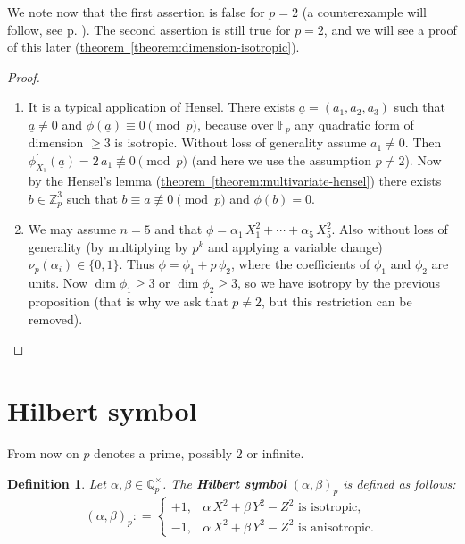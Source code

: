 \documentclass{article}
\newcommand{\term}{\textbf}
\newcommand{\dfn}{\mathrel{\mathop:}=}
\newcommand{\ZZ}{\mathbb{Z}}
\newcommand{\FF}{\mathbb{F}}
\newcommand{\QQ}{\mathbb{Q}}
\newcommand{\refref}[2]{\hyperref[#2]{#1~\ref*{#2}}}
\theoremstyle{myplain}
\theoremstyle{mydefinition}
\newtheorem{definition}[proposition]{Definition}
\begin{document}
We note now that the first assertion is false for $p = 2$ (a counterexample will
follow, see p. \pageref{x2y2z2-anisotropic-over-q2}). The second assertion is
still true for $p = 2$, and we will see a proof of this later
(\refref{theorem}{theorem:dimension-isotropic}).

\begin{proof}
  \begin{enumerate}
  \item It is a typical application of Hensel. There exists
    $\underline{a} = (a_1,a_2,a_3)$ such that $\underline{a} \ne 0$ and
    $\phi (\underline{a}) \equiv 0 \pmod{p}$, because over $\FF_p$ any quadratic
    form of dimension $\ge 3$ is isotropic. Without loss of generality assume
    $a_1 \ne 0$. Then
    $\phi^\prime_{X_1} (\underline{a}) = 2\,a_1 \not\equiv 0 \pmod{p}$ (and here
    we use the assumption $p \ne 2$). Now by the Hensel's lemma
    (\refref{theorem}{theorem:multivariate-hensel}) there exists
    $\underline{b} \in \ZZ_p^3$ such that
    $\underline{b} \equiv \underline{a} \not \equiv 0 \pmod{p}$ and
    $\phi (\underline{b}) = 0$.

  \item We may assume $n = 5$ and that
    $\phi = \alpha_1\,X_1^2 + \cdots + \alpha_5\,X_5^2$. Also without loss of
    generality (by multiplying by $p^k$ and applying a variable change)
    $ \nu_p (\alpha_i) \in \{ 0,1 \}$. Thus $\phi = \phi_1 + p\,\phi_2$, where
    the coefficients of $\phi_1$ and $\phi_2$ are units. Now $\dim \phi_1 \ge 3$
    or $\dim \phi_2 \ge 3$, so we have isotropy by the previous proposition
    (that is why we ask that $p \ne 2$, but this restriction can be removed).
  \end{enumerate}
\end{proof}

\section{Hilbert symbol}

From now on $p$ denotes a prime, possibly $2$ or infinite.

\begin{definition}
  Let $\alpha,\beta \in \QQ_p^\times$. The \term{Hilbert symbol}
  $(\alpha,\beta)_p$ is defined as follows:
  \[ (\alpha,\beta)_p \dfn
    \left\{\begin{array}{ll}
             +1, & \alpha\,X^2 + \beta\,Y^2 - Z^2 \text{ is isotropic},\\
             -1, & \alpha\,X^2 + \beta\,Y^2 - Z^2 \text{ is anisotropic}.
           \end{array}\right. \]
\end{definition}
\end{document}
